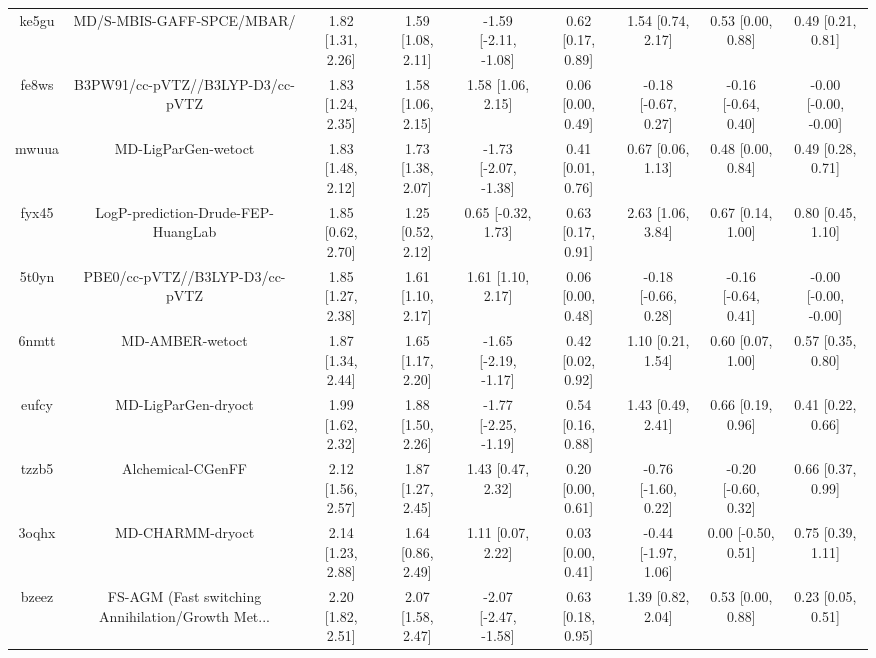 \documentclass{article}
\begin{document}
\begin{center}
\begin{longtable}{|ccccccccc|}
 ke5gu &                          MD/S-MBIS-GAFF-SPCE/MBAR/ &  1.82 [1.31, 2.26] &  1.59 [1.08, 2.11] &  -1.59 [-2.11, -1.08] &  0.62 [0.17, 0.89] &    1.54 [0.74, 2.17] &    0.53 [0.00, 0.88] &     0.49 [0.21, 0.81] \\
 fe8ws &                   B3PW91/cc-pVTZ//B3LYP-D3/cc-pVTZ &  1.83 [1.24, 2.35] &  1.58 [1.06, 2.15] &     1.58 [1.06, 2.15] &  0.06 [0.00, 0.49] &  -0.18 [-0.67, 0.27] &  -0.16 [-0.64, 0.40] &  -0.00 [-0.00, -0.00] \\
 mwuua &                                MD-LigParGen-wetoct &  1.83 [1.48, 2.12] &  1.73 [1.38, 2.07] &  -1.73 [-2.07, -1.38] &  0.41 [0.01, 0.76] &    0.67 [0.06, 1.13] &    0.48 [0.00, 0.84] &     0.49 [0.28, 0.71] \\
 fyx45 &                 LogP-prediction-Drude-FEP-HuangLab &  1.85 [0.62, 2.70] &  1.25 [0.52, 2.12] &    0.65 [-0.32, 1.73] &  0.63 [0.17, 0.91] &    2.63 [1.06, 3.84] &    0.67 [0.14, 1.00] &     0.80 [0.45, 1.10] \\
 5t0yn &                     PBE0/cc-pVTZ//B3LYP-D3/cc-pVTZ &  1.85 [1.27, 2.38] &  1.61 [1.10, 2.17] &     1.61 [1.10, 2.17] &  0.06 [0.00, 0.48] &  -0.18 [-0.66, 0.28] &  -0.16 [-0.64, 0.41] &  -0.00 [-0.00, -0.00] \\
 6nmtt &                                    MD-AMBER-wetoct &  1.87 [1.34, 2.44] &  1.65 [1.17, 2.20] &  -1.65 [-2.19, -1.17] &  0.42 [0.02, 0.92] &    1.10 [0.21, 1.54] &    0.60 [0.07, 1.00] &     0.57 [0.35, 0.80] \\
 eufcy &                                MD-LigParGen-dryoct &  1.99 [1.62, 2.32] &  1.88 [1.50, 2.26] &  -1.77 [-2.25, -1.19] &  0.54 [0.16, 0.88] &    1.43 [0.49, 2.41] &    0.66 [0.19, 0.96] &     0.41 [0.22, 0.66] \\
 tzzb5 &                                  Alchemical-CGenFF &  2.12 [1.56, 2.57] &  1.87 [1.27, 2.45] &     1.43 [0.47, 2.32] &  0.20 [0.00, 0.61] &  -0.76 [-1.60, 0.22] &  -0.20 [-0.60, 0.32] &     0.66 [0.37, 0.99] \\
 3oqhx &                                   MD-CHARMM-dryoct &  2.14 [1.23, 2.88] &  1.64 [0.86, 2.49] &     1.11 [0.07, 2.22] &  0.03 [0.00, 0.41] &  -0.44 [-1.97, 1.06] &   0.00 [-0.50, 0.51] &     0.75 [0.39, 1.11] \\
 bzeez &  FS-AGM (Fast switching Annihilation/Growth Met... &  2.20 [1.82, 2.51] &  2.07 [1.58, 2.47] &  -2.07 [-2.47, -1.58] &  0.63 [0.18, 0.95] &    1.39 [0.82, 2.04] &    0.53 [0.00, 0.88] &     0.23 [0.05, 0.51] \\

\end{longtable}
\end{center}
\end{document}
